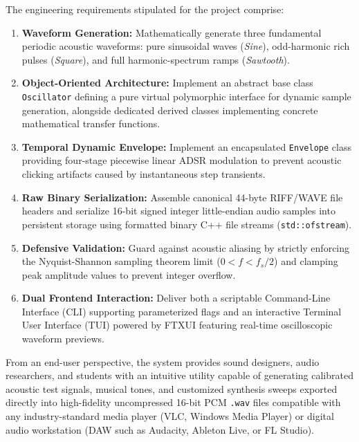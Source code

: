 \documentclass[12pt,a4paper,oneside]{book}
\begin{document}
The engineering requirements stipulated for the project comprise:
\begin{enumerate}
    \item \textbf{Waveform Generation:} Mathematically generate three fundamental periodic acoustic waveforms: pure sinusoidal waves (\textit{Sine}), odd-harmonic rich pulses (\textit{Square}), and full harmonic-spectrum ramps (\textit{Sawtooth}).
    \item \textbf{Object-Oriented Architecture:} Implement an abstract base class \texttt{Oscillator} defining a pure virtual polymorphic interface for dynamic sample generation, alongside dedicated derived classes implementing concrete mathematical transfer functions.
    \item \textbf{Temporal Dynamic Envelope:} Implement an encapsulated \texttt{Envelope} class providing four-stage piecewise linear ADSR modulation to prevent acoustic clicking artifacts caused by instantaneous step transients.
    \item \textbf{Raw Binary Serialization:} Assemble canonical 44-byte RIFF/WAVE file headers and serialize 16-bit signed integer little-endian audio samples into persistent storage using formatted binary C++ file streams (\texttt{std::ofstream}).
    \item \textbf{Defensive Validation:} Guard against acoustic aliasing by strictly enforcing the Nyquist-Shannon sampling theorem limit ($0 < f < f_s / 2$) and clamping peak amplitude values to prevent integer overflow.
    \item \textbf{Dual Frontend Interaction:} Deliver both a scriptable Command-Line Interface (CLI) supporting parameterized flags and an interactive Terminal User Interface (TUI) powered by FTXUI featuring real-time oscilloscopic waveform previews.
\end{enumerate}

From an end-user perspective, the system provides sound designers, audio researchers, and students with an intuitive utility capable of generating calibrated acoustic test signals, musical tones, and customized synthesis sweeps exported directly into high-fidelity uncompressed 16-bit PCM \texttt{.wav} files compatible with any industry-standard media player (VLC, Windows Media Player) or digital audio workstation (DAW such as Audacity, Ableton Live, or FL Studio).

\end{document}
